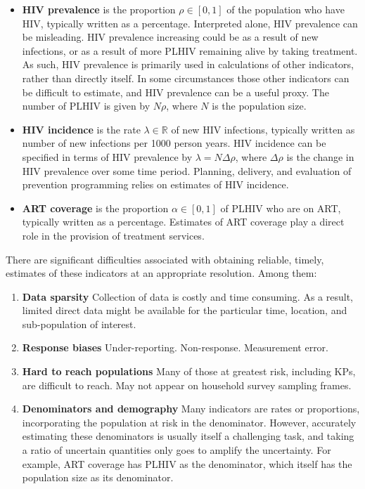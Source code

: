 \documentclass[a4paper, nobind]{templates/ociamthesis}
\providecommand{\tightlist}{%
  \setlength{\itemsep}{0pt}\setlength{\parskip}{0pt}}
\begin{document}
\begin{itemize}
\tightlist
\item
  \textbf{HIV prevalence} is the proportion \(\rho \in [0, 1]\) of the population who have HIV, typically written as a percentage.
  Interpreted alone, HIV prevalence can be misleading.
  HIV prevalence increasing could be as a result of new infections, or as a result of more PLHIV remaining alive by taking treatment.
  As such, HIV prevalence is primarily used in calculations of other indicators, rather than directly itself.
  In some circumstances those other indicators can be difficult to estimate, and HIV prevalence can be a useful proxy.
  The number of PLHIV is given by \(N\rho\), where \(N\) is the population size.
\item
  \textbf{HIV incidence} is the rate \(\lambda \in \mathbb{R}\) of new HIV infections, typically written as number of new infections per 1000 person years.
  HIV incidence can be specified in terms of HIV prevalence by \(\lambda = N\Delta\rho\), where \(\Delta\rho\) is the change in HIV prevalence over some time period.
  Planning, delivery, and evaluation of prevention programming relies on estimates of HIV incidence.
\item
  \textbf{ART coverage} is the proportion \(\alpha \in [0, 1]\) of PLHIV who are on ART, typically written as a percentage.
  Estimates of ART coverage play a direct role in the provision of treatment services.
\end{itemize}

There are significant difficulties associated with obtaining reliable, timely, estimates of these indicators at an appropriate resolution.
Among them:

\begin{enumerate}
\def\labelenumi{\arabic{enumi}.}
\tightlist
\item
  \textbf{Data sparsity}
  Collection of data is costly and time consuming.
  As a result, limited direct data might be available for the particular time, location, and sub-population of interest.
\item
  \textbf{Response biases}
  Under-reporting.
  Non-response.
  Measurement error.
\item
  \textbf{Hard to reach populations}
  Many of those at greatest risk, including KPs, are difficult to reach.
  May not appear on household survey sampling frames.
\item
  \textbf{Denominators and demography}
  Many indicators are rates or proportions, incorporating the population at risk in the denominator.
  However, accurately estimating these denominators is usually itself a challenging task, and taking a ratio of uncertain quantities only goes to amplify the uncertainty.
  For example, ART coverage has PLHIV as the denominator, which itself has the population size as its denominator.
\end{enumerate}
\end{document}
